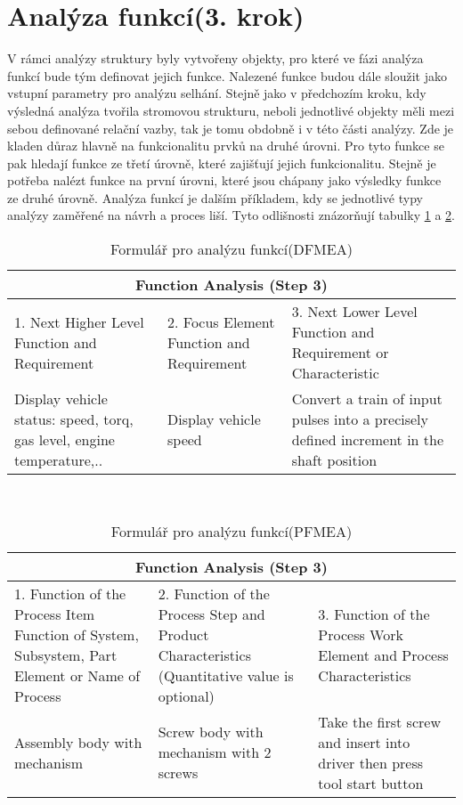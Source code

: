 \section{Analýza funkcí(3. krok)}
\label{sec:FMEA_postup_3}
V rámci analýzy struktury byly vytvořeny objekty, pro které ve fázi analýza funkcí bude tým definovat jejich funkce. Nalezené funkce budou dále sloužit jako vstupní parametry pro analýzu selhání. Stejně jako v předchozím kroku, kdy výsledná analýza tvořila stromovou strukturu, neboli jednotlivé objekty měli mezi sebou definované relační vazby, tak je tomu obdobně i v této části analýzy. Zde je kladen důraz hlavně na funkcionalitu prvků na druhé úrovni. Pro tyto funkce se pak hledají funkce ze třetí úrovně, které zajišťují jejich funkcionalitu. Stejně je potřeba nalézt funkce na první úrovni, které jsou chápany jako výsledky funkce ze druhé úrovně. Analýza funkcí je dalším příkladem, kdy se jednotlivé typy analýzy zaměřené na návrh a proces liší. Tyto odlišnosti znázorňují tabulky \ref{tab:function_DFMEA} a \ref{tab:function_PFMEA}.

\begin{center}
\begin{table}[h]
	\centering
	\caption{Formulář pro analýzu funkcí(DFMEA) }
	\label{tab:function_DFMEA}
\begin{tabular}{ |p{5cm}|p{5cm}|p{5cm}|  }
 \hline
 \multicolumn{3}{|c|}{Function Analysis (Step 3)} \\
 \hline
 1. Next Higher Level Function and Requirement &
2. Focus Element
Function and Requirement &
3. Next Lower Level Function and Requirement or Characteristic\\
 \hline
 Display vehicle status: speed, torq, gas level, engine temperature,..   & Display vehicle speed    & Convert a train of input pulses into a precisely defined increment in the shaft position\\


 \hline
\end{tabular}\  
\end{table}
\end{center}

\begin{center}
\begin{table}[h]
	\centering
	\caption{Formulář pro analýzu funkcí(PFMEA) }
	\label{tab:function_PFMEA}
\begin{tabular}{ |p{5cm}|p{5cm}|p{5cm}|  }
 \hline
 \multicolumn{3}{|c|}{Function Analysis (Step 3)} \\
 \hline
1. Function of the Process Item
Function of System, Subsystem, Part Element or Name of Process
& 2. Function of the Process Step and Product Characteristics
(Quantitative value is optional)
& 3. Function of the Process Work Element and Process Characteristics
\\
 \hline
Assembly body with mechanism   & Screw body with mechanism with 2 screws   &Take the first screw and insert into driver then press tool start button\\


 \hline
\end{tabular}\  
\end{table}
\end{center}

